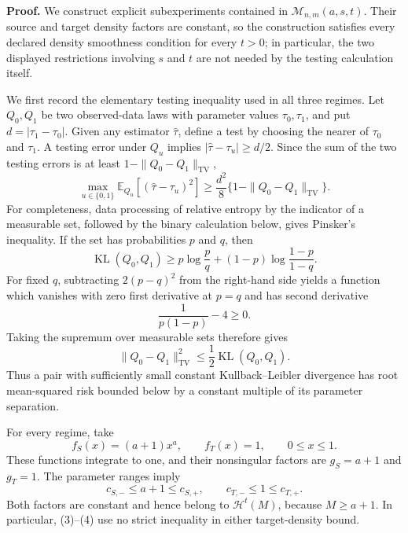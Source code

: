 \textbf{Proof.}
We construct explicit subexperiments contained in \(\mathcal M_{n,m}(a,s,t)\).  Their source and target density factors are constant, so the construction satisfies every declared density smoothness condition for every \(t>0\); in particular, the two displayed restrictions involving \(s\) and \(t\) are not needed by the testing calculation itself.

We first record the elementary testing inequality used in all three regimes.  Let \(Q_0,Q_1\) be two observed-data laws with parameter values \(\tau_0,\tau_1\), and put \(d=|\tau_1-\tau_0|\).  Given any estimator \(\widehat\tau\), define a test by choosing the nearer of \(\tau_0\) and \(\tau_1\).  A testing error under \(Q_u\) implies \(|\widehat\tau-\tau_u|\ge d/2\).  Since the sum of the two testing errors is at least \(1-\|Q_0-Q_1\|_{\mathrm{TV}}\),
\[
 \max_{u\in\{0,1\}}\mathbb E_{Q_u}
       [ (\widehat\tau-\tau_u)^2]
 \ge \frac{d^2}{8}
       \{1-\|Q_0-Q_1\|_{\mathrm{TV}}\}.
\tag{1}
\]
For completeness, data processing of relative entropy by the indicator of a measurable set, followed by the binary calculation below, gives Pinsker's inequality.  If the set has probabilities \(p\) and \(q\), then
\[
 \operatorname{KL}(Q_0,Q_1)
 \ge p\log\frac pq+(1-p)\log\frac{1-p}{1-q}.
\]
For fixed \(q\), subtracting \(2(p-q)^2\) from the right-hand side yields a function which vanishes with zero first derivative at \(p=q\) and has second derivative
\[
 \frac1{p(1-p)}-4\ge0.
\]
Taking the supremum over measurable sets therefore gives
\[
 \|Q_0-Q_1\|_{\mathrm{TV}}^2
 \le \frac12\operatorname{KL}(Q_0,Q_1).
\tag{2}
\]
Thus a pair with sufficiently small constant Kullback--Leibler divergence has root mean-squared risk bounded below by a constant multiple of its parameter separation.

For every regime, take
\[
 f_S(x)=(a+1)x^a,
 \qquad f_T(x)=1,
 \qquad 0\le x\le1.
\tag{3}
\]
These functions integrate to one, and their nonsingular factors are \(g_S=a+1\) and \(g_T=1\).  The parameter ranges imply
\[
 c_{S,-}\le a+1\le c_{S,+},
 \qquad c_{T,-}\le1\le c_{T,+}.
\tag{4}
\]
Both factors are constant and hence belong to \(\mathcal H^t(M)\), because \(M\ge a+1\).  In particular, (3)--(4) use no strict inequality in either target-density bound.

